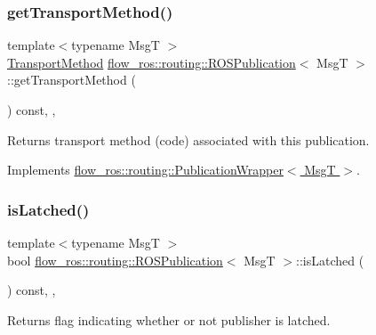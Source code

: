 \subsubsection{\texorpdfstring{get\+Transport\+Method()}{getTransportMethod()}}
{\footnotesize\ttfamily template$<$typename MsgT $>$ \\
\hyperlink{transport__info_8h_ae57afcf849a5bdb82b958347c6ccc57b}{Transport\+Method} \hyperlink{classflow__ros_1_1routing_1_1_r_o_s_publication}{flow\+\_\+ros\+::routing\+::\+R\+O\+S\+Publication}$<$ MsgT $>$\+::get\+Transport\+Method (\begin{DoxyParamCaption}{ }\end{DoxyParamCaption}) const\hspace{0.3cm}{\ttfamily [inline]}, {\ttfamily [override]}, {\ttfamily [virtual]}}



Returns transport method (code) associated with this publication. 



Implements \hyperlink{classflow__ros_1_1routing_1_1_publication_wrapper_a0398202c79a6bdb1ff57acc8c730bc65}{flow\+\_\+ros\+::routing\+::\+Publication\+Wrapper$<$ Msg\+T $>$}.

\mbox{\label{classflow__ros_1_1routing_1_1_r_o_s_publication_a1abd966d244c71911a75a20a089025bc}} 
\subsubsection{\texorpdfstring{is\+Latched()}{isLatched()}}
{\footnotesize\ttfamily template$<$typename MsgT $>$ \\
bool \hyperlink{classflow__ros_1_1routing_1_1_r_o_s_publication}{flow\+\_\+ros\+::routing\+::\+R\+O\+S\+Publication}$<$ MsgT $>$\+::is\+Latched (\begin{DoxyParamCaption}{ }\end{DoxyParamCaption}) const\hspace{0.3cm}{\ttfamily [inline]}, {\ttfamily [override]}, {\ttfamily [virtual]}}



Returns flag indicating whether or not publisher is latched. 



